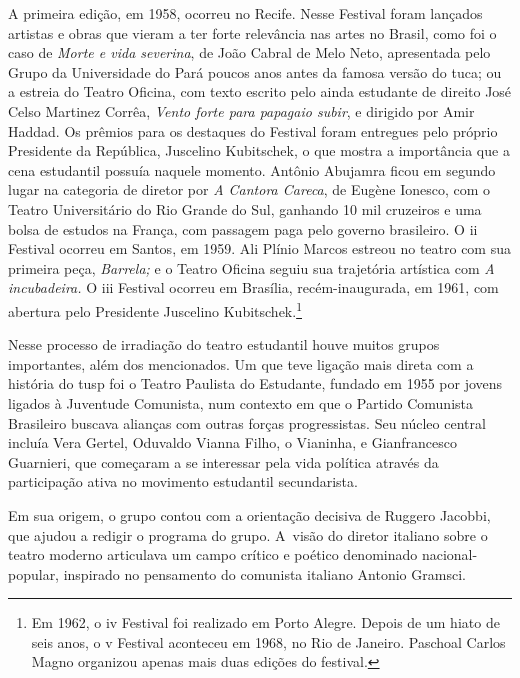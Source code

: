 {A primeira edição, em 1958, ocorreu no Recife. Nesse Festival foram
lançados artistas e obras que vieram a ter forte relevância nas artes no
Brasil, como foi o caso de {\it Morte e vida severina}, de João Cabral
de Melo Neto, apresentada pelo Grupo da Universidade do Pará poucos anos
antes da famosa versão do {\sc tuca}; ou a estreia do Teatro Oficina, com
texto escrito pelo ainda estudante de direito José Celso Martinez
Corrêa, {\it Vento forte para papagaio subir}, e dirigido por Amir
Haddad. Os prêmios para os destaques do Festival foram entregues pelo
próprio Presidente da República, Juscelino Kubitschek, o que mostra a
importância que a cena estudantil possuía naquele momento. Antônio
Abujamra ficou em segundo lugar na categoria de diretor por {\it A
Cantora Careca}, de Eugène Ionesco, com o Teatro Universitário do Rio
Grande do Sul, ganhando 10 mil cruzeiros e uma bolsa de estudos na
França, com passagem paga pelo governo brasileiro. O {\sc ii} Festival ocorreu
em Santos, em 1959. Ali Plínio Marcos estreou no teatro com sua primeira
peça, {\it Barrela;} e o Teatro Oficina seguiu sua trajetória artística
com {\it A incubadeira.} O {\sc iii} Festival ocorreu em Brasília,
recém-inaugurada, em 1961, com abertura pelo Presidente Juscelino
Kubitschek.\footnote{Em 1962, o {\sc iv} Festival foi realizado em Porto
  Alegre. Depois de um hiato de seis anos, o {\sc v} Festival aconteceu em
  1968, no Rio de Janeiro. Paschoal Carlos Magno organizou apenas mais
  duas edições do festival.}

\subject{Estudantes e a ideia de nacional-popular: Teatro Paulista do
Estudante}

Nesse processo de irradiação do teatro estudantil houve muitos grupos
importantes, além dos mencionados. Um que teve ligação mais direta com a
história do {\sc tusp} foi o Teatro Paulista do Estudante, fundado em 1955 por
jovens ligados à Juventude Comunista, num contexto em que o Partido
Comunista Brasileiro buscava alianças com outras forças progressistas.
Seu núcleo central incluía Vera Gertel, Oduvaldo Vianna Filho, o
Vianinha, e Gianfrancesco Guarnieri, que começaram a se interessar pela
vida política através da participação ativa no movimento estudantil
secundarista.

Em sua origem, o grupo contou com a orientação decisiva de Ruggero
Jacobbi, que ajudou a redigir o programa do grupo. A~visão do diretor
italiano sobre o teatro moderno articulava um campo crítico e poético
denominado nacional-popular, inspirado no pensamento do comunista
italiano Antonio Gramsci.

}
